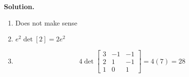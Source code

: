 \documentclass[12pt]{article}
\begin{document}
\textbf{Solution.}
\begin{enumerate}
  \item Does not make sense 
  \item $e^2 \det [2] = 2e^2$
  \item \[
    4 \det \begin{bmatrix}
      3 & -1 & -1 \\
      2 & 1 & -1 \\
      1 & 0 & 1
    \end{bmatrix}
    = 4(7)
    = 28
  \]
\end{enumerate}
\newpage
\end{document}
